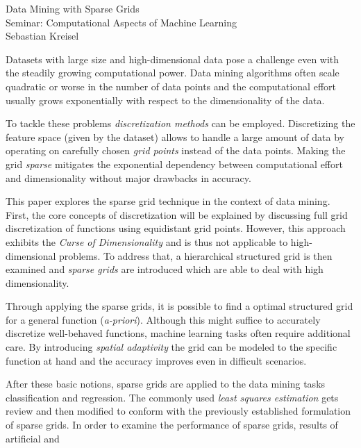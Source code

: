 \documentclass[a4paper]{scrartcl}
\begin{document}
\thispagestyle{empty}
\begin{center}
  \huge{Data Mining with Sparse Grids} \\
  \vspace{6px}
  \large{Seminar: Computational Aspects of Machine Learning} \\
  \vspace{15px}
  Sebastian Kreisel
\end{center}
\vspace{30px}
Datasets with large size and high-dimensional data pose a challenge even
with the steadily growing computational power.
Data mining algorithms often scale quadratic or worse in the number of
data points and the computational effort usually grows exponentially with
respect to the
dimensionality of the data.
\par
To tackle these problems \emph{discretization methods} can be employed.
Discretizing the feature space (given by the dataset)
allows to handle a large amount of data
by operating on carefully chosen \emph{grid points} instead of the data points.
Making the grid \emph{sparse} mitigates the exponential
dependency between computational effort and dimensionality without
major drawbacks in accuracy.
\par
This paper explores the sparse grid technique in the context of data mining.
First, the core concepts of discretization will be explained by
discussing full grid discretization of functions
using equidistant grid points. However,
this approach exhibits the \emph{Curse of Dimensionality} and is thus not
applicable to high-dimensional problems. To address that, a hierarchical
structured grid is then examined and
\emph{sparse grids} are introduced which are able to deal with high
dimensionality.
\par
Through applying the sparse grids,
it is possible to find a optimal structured
grid for a general function (\emph{a-priori}). Although this might suffice to
accurately discretize well-behaved functions, machine learning
tasks often require additional care. By introducing \emph{spatial adaptivity}
the grid can be modeled to the specific function at hand and the accuracy
improves even in difficult scenarios.
\par
After these basic notions, sparse grids are
applied to the data mining tasks classification and regression.
The commonly used \emph{least squares
estimation} gets review and then modified to conform with the
previously established formulation of sparse grids. In order to examine
the performance of sparse grids, results of artificial and
\end{document}
